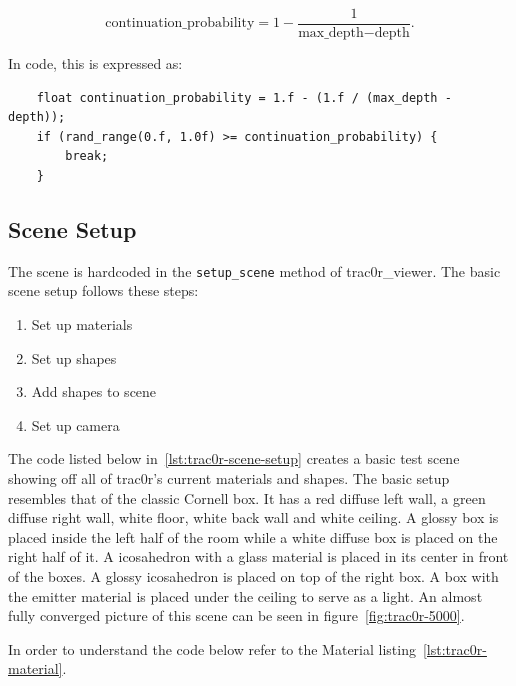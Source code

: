 \documentclass[
  twoside,
  11pt, a4paper,
  footinclude=true,
  headinclude=true,
  cleardoublepage=empty
]{scrreprt}
\begin{document}
\[\text{continuation\_probability} = 1 - \frac 1 {\text{max\_depth} - \text{depth}}.\]

In code, this is expressed as:

\begin{verbatim}
    float continuation_probability = 1.f - (1.f / (max_depth - depth));
    if (rand_range(0.f, 1.0f) >= continuation_probability) {
        break;
    }
\end{verbatim}
\begingroup
{}
\endgroup

\subsection{Scene Setup}
The scene is hardcoded in the \texttt{setup\_scene} method of trac0r\_viewer. The basic scene setup
follows these steps:

\begin{enumerate}
    \item Set up materials
    \item Set up shapes
    \item Add shapes to scene
    \item Set up camera
\end{enumerate}

The code listed below in~\ref{lst:trac0r-scene-setup} creates a basic test scene showing off all of
trac0r's current materials and shapes. The basic setup resembles that of the classic Cornell box. It has
a red diffuse left wall, a green diffuse right wall, white floor, white back wall and white ceiling.
A glossy box is placed inside the left half of the room while a white diffuse box is placed on the
right half of it. A icosahedron with a glass material is placed in its center in front of the
boxes. A glossy icosahedron is placed on top of the right box. A box with the emitter material is
placed under the ceiling to serve as a light. An almost fully converged picture of this scene can
be seen in figure~\ref{fig:trac0r-5000}.

In order to understand the code below refer to the Material listing~\ref{lst:trac0r-material}.
\end{document}
